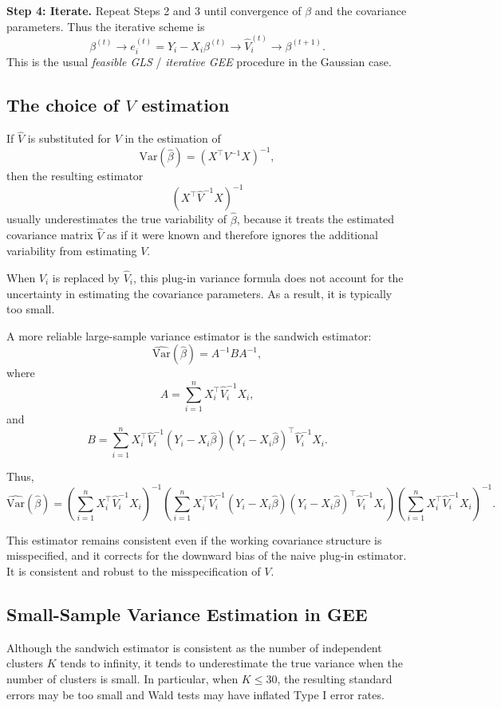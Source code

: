 \documentclass[11pt]{article}
\theoremstyle{definition}
\begin{document}
\medskip
\textbf{Step 4: Iterate.}  
Repeat Steps 2 and 3 until convergence of \(\beta\) and the covariance parameters.
\medskip
Thus the iterative scheme is
\[
\beta^{(t)}
\longrightarrow
e_i^{(t)}=Y_i-X_i\beta^{(t)}
\longrightarrow
\hat V_i^{(t)}
\longrightarrow
\beta^{(t+1)}.
\]
This is the usual \emph{feasible GLS} / \emph{iterative GEE} procedure in the Gaussian case.
\subsection*{The choice of $V$ estimation}
If \(\hat V\) is substituted for \(V\) in the estimation of
\[
\mathrm{Var}(\hat\beta)=(X^\top V^{-1}X)^{-1},
\]
then the resulting estimator
\[
(X^\top \hat V^{-1}X)^{-1}
\]
usually underestimates the true variability of \(\hat\beta\), because it treats the estimated covariance matrix \(\hat V\) as if it were known and therefore ignores the additional variability from estimating \(V\).

When \(V_i\) is replaced by \(\hat V_i\), this plug-in variance formula does not account for the uncertainty in estimating the covariance parameters. As a result, it is typically too small.

A more reliable large-sample variance estimator is the sandwich estimator:
\[
\widehat{\mathrm{Var}}(\hat\beta)
=
A^{-1}BA^{-1},
\]
where
\[
A=\sum_{i=1}^n X_i^\top \hat V_i^{-1}X_i,
\]
and
\[
B=\sum_{i=1}^n X_i^\top \hat V_i^{-1}
(Y_i-X_i\hat\beta)(Y_i-X_i\hat\beta)^\top
\hat V_i^{-1}X_i.
\]

Thus,
\[
\widehat{\mathrm{Var}}(\hat\beta)
=
\left(\sum_{i=1}^n X_i^\top \hat V_i^{-1}X_i\right)^{-1}
\left(\sum_{i=1}^n X_i^\top \hat V_i^{-1}
(Y_i-X_i\hat\beta)(Y_i-X_i\hat\beta)^\top
\hat V_i^{-1}X_i\right)
\left(\sum_{i=1}^n X_i^\top \hat V_i^{-1}X_i\right)^{-1}.
\]

This estimator remains consistent even if the working covariance structure is misspecified, and it corrects for the downward bias of the naive plug-in estimator. It is consistent and robust to the misspecification of $V$.

\subsection*{Small-Sample Variance Estimation in GEE}
Although the sandwich estimator is consistent as the number of independent
clusters \(K\) tends to infinity, it tends to underestimate the true
variance when the number of clusters is small. In particular, when
\(K\leq 30\), the resulting standard errors may be too small and Wald tests
may have inflated Type I error rates.
\end{document}
